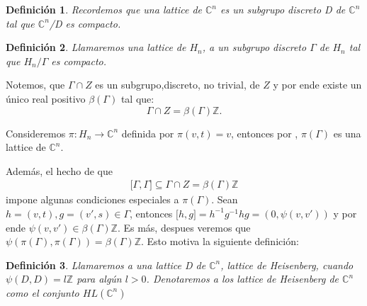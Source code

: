 \documentclass[12pt]{article}
\newtheorem{definition}{Definición}
\begin{document}
\begin{definition}
 Recordemos que una lattice de $\mathbb{C}^n$ es un subgrupo discreto D de $\mathbb{C}^n$ tal que $\mathbb{C}^n$/D es compacto.
\end{definition}

\begin{definition}
 Llamaremos una lattice de $H_n$, a un subgrupo discreto $\Gamma$ de $H_n$ tal que $H_n/\Gamma$ es compacto.
\end{definition}

Notemos, que  $\Gamma \cap Z$ es un subgrupo,discreto, no trivial, de $Z$ y 
por ende existe un único real positivo $\beta(\Gamma)$ tal que:
$$
\Gamma \cap Z=\beta(\Gamma) \mathbb{Z}.
$$

Consideremos $\pi :H_{n}\rightarrow \mathbb{C}^{n}$  definida por $\pi (v,t)=v$,
entonces por \cite{Ma}, $\pi(\Gamma)$ es una lattice de $\mathbb{C}^n$.

Además, el hecho de que
$$\begin{aligned}
{[} \Gamma,\Gamma {]} \subseteq \Gamma \cap Z = \beta(\Gamma) \mathbb{Z}
\end{aligned}$$
impone algunas condiciones especiales a $\pi(\Gamma)$.
Sean $h=(v,t),g=(v',s) \in \Gamma$, entonces ${[}h,g{]}=h^{-1}g^{-1}hg=(0,\psi(v,v'))$ 
y por ende $\psi(v,v') \in  \beta(\Gamma) \mathbb{Z}$.
Es más, despues veremos que $\psi(\pi(\Gamma),\pi(\Gamma))=\beta(\Gamma) \mathbb{Z}$.
Esto motiva la siguiente definición:

\begin{definition}
 Llamaremos a una lattice D de $\mathbb{C}^n$, lattice de Heisenberg, cuando $\psi(D,D)=l \mathbb{Z} $ para algún $l > 0$.
 Denotaremos a los lattice de Heisenberg de $\mathbb{C}^n$ como el conjunto $HL(\mathbb{C}^n)$
\end{definition}
\end{document}
